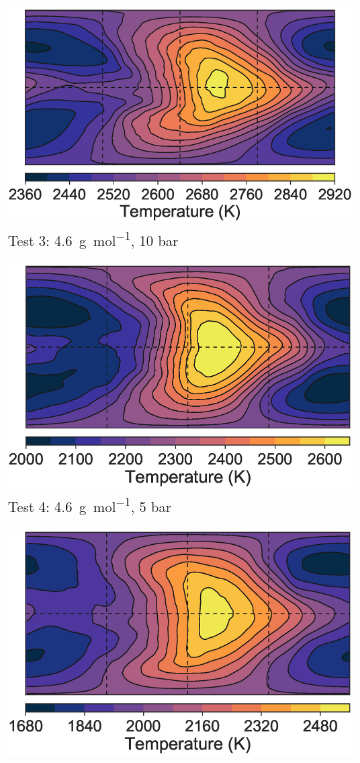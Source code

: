\begin{figure}
  \begin{subfigure}[t]{0.33\textwidth}
    \includegraphics[width=\textwidth]{figures/linking-climate-55cnce/H2N2_10_halfp.eps}
    \caption{Test 3: \SI{4.6}{\gram\per\mole}, 10 bar}
    \label{fig:free-u-shear}
  \end{subfigure}
  \begin{subfigure}[t]{0.33\textwidth}
    \includegraphics[width=\textwidth]{figures/linking-climate-55cnce/H2N2_5_halfp.eps}
    \caption{Test 4: \SI{4.6}{\gram\per\mole}, 5 bar}
    \label{fig:free-v-shear}
  \end{subfigure}
  \begin{subfigure}[t]{0.33\textwidth}
    \includegraphics[width=\textwidth]{figures/linking-climate-55cnce/H2N2_3_halfp.eps}

\end{subfigure}
\end{figure}
